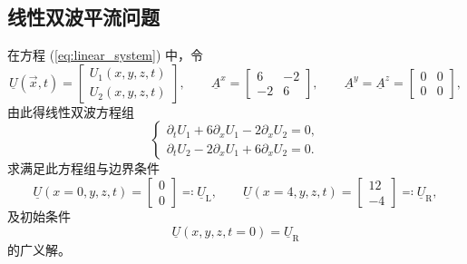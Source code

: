 \subsection{线性双波平流问题}
\begin{problem}
[线性双波平流]\label{prob:=007EBF=006027=0053CC=006CE2=005E73=006D41}在方程
(\ref{eq:linear_system}) 中，令
\begin{equation}
\underline{U}(\vec{x},t)=\begin{bmatrix}U_{1}(x,y,z,t)\\
U_{2}(x,y,z,t)
\end{bmatrix},\qquad\underline{A}^{x}=\begin{bmatrix}6 & -2\\
-2 & 6
\end{bmatrix},\qquad\underline{A}^{y}=\underline{A}^{z}=\begin{bmatrix}0 & 0\\
0 & 0
\end{bmatrix},
\end{equation}
由此得线性双波方程组
\begin{equation}
\begin{cases}
\partial_{t}U_{1}+6\partial_{x}U_{1}-2\partial_{x}U_{2}=0,\\
\partial_{t}U_{2}-2\partial_{x}U_{1}+6\partial_{x}U_{2}=0.
\end{cases}\label{eq:linear_double_wave}
\end{equation}
求满足此方程组与边界条件
\begin{equation}
\underline{U}(x=0,y,z,t)=\begin{bmatrix}0\\
0
\end{bmatrix}\eqqcolon\underline{U}_{\mathrm{L}},\qquad\underline{U}(x=4,y,z,t)=\begin{bmatrix}12\\
-4
\end{bmatrix}\eqqcolon\underline{U}_{\mathrm{R}},
\end{equation}
及初始条件
\begin{equation}
\underline{U}(x,y,z,t=0)=\underline{U}_{\mathrm{R}}
\end{equation}
的广义解。
\end{problem}

\newpage{}

